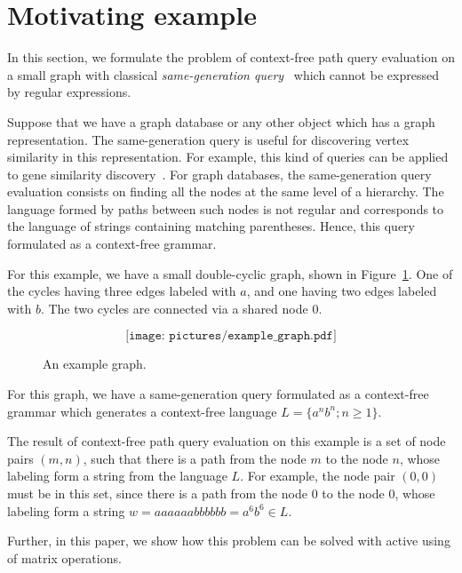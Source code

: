 \section{Motivating example}
In this section, we formulate the problem of context-free path query evaluation on a small graph with classical \textit{same-generation query}~\cite{FndDB} which cannot be expressed by regular expressions.

Suppose that we have a graph database or any other object which has a graph representation. The same-generation query is useful for discovering vertex similarity in this representation. For example, this kind of queries can be applied to gene similarity discovery~\cite{GraphQueryWithEarley}. For graph databases, the same-generation query evaluation consists on finding all the nodes at the same level of a hierarchy. The language formed by paths between such nodes is not regular and corresponds to the language of strings containing matching parentheses. Hence, this query formulated as a context-free grammar.

For this example, we have a small double-cyclic graph, shown in Figure~\ref{Example_Graph}. One of the cycles having three edges labeled with $a$, and one having two edges labeled with $b$. The two cycles are connected via
a shared node $0$.

\begin{figure}[h]
	\[
	\texttt{[image: pictures/example\_graph.pdf]}
	\]
	\caption{An example graph.}
	\label{Example_Graph}
\end{figure}

For this graph, we have a same-generation query formulated as a context-free grammar which generates a context-free language $L=\{a^n b^n; n \geq 1\}$.

The result of context-free path query evaluation on this example is a set of node pairs $(m, n)$, such that there is a path from the node $m$ to the node $n$, whose labeling form a string from the language $L$. For example, the node pair $(0,0)$ must be in this set, since there is a path from the node $0$ to the node $0$, whose labeling form a string $w = aaaaaabbbbbb = a^6b^6 \in L$.

Further, in this paper, we show how this problem can be solved with active using of matrix operations.